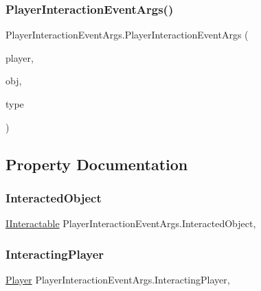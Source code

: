 \subsubsection{\texorpdfstring{Player\+Interaction\+Event\+Args()}{PlayerInteractionEventArgs()}}
{\footnotesize\ttfamily Player\+Interaction\+Event\+Args.\+Player\+Interaction\+Event\+Args (\begin{DoxyParamCaption}\item[{\mbox{\hyperlink{class_player}{Player}}}]{player,  }\item[{\mbox{\hyperlink{interface_i_interactable}{I\+Interactable}}}]{obj,  }\item[{\mbox{\hyperlink{class_player_interaction_event_args_a5ee5b290c0a1c78cd0496cad571933d2}{Interacting\+With}}}]{type }\end{DoxyParamCaption})}



\subsection{Property Documentation}
\mbox{\label{class_player_interaction_event_args_ae88bd017816f3fd0d3e2f6f88bbf5c74}} 
\subsubsection{\texorpdfstring{Interacted\+Object}{InteractedObject}}
{\footnotesize\ttfamily \mbox{\hyperlink{interface_i_interactable}{I\+Interactable}} Player\+Interaction\+Event\+Args.\+Interacted\+Object\hspace{0.3cm}{\ttfamily [get]}, {}}

\mbox{\label{class_player_interaction_event_args_a6e4d98fdc7ecd9286e014ec6c289055d}} 
\subsubsection{\texorpdfstring{Interacting\+Player}{InteractingPlayer}}
{\footnotesize\ttfamily \mbox{\hyperlink{class_player}{Player}} Player\+Interaction\+Event\+Args.\+Interacting\+Player\hspace{0.3cm}{\ttfamily [get]}, {}}

